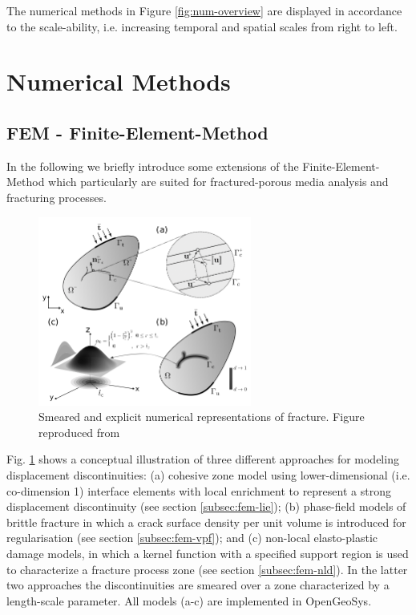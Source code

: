 The numerical methods in Figure \ref{fig:num-overview} are displayed in accordance to the scale-ability, i.e. increasing temporal and spatial scales from right to left.


\section{Numerical Methods}




\subsection*{FEM - Finite-Element-Method}
In the following we briefly introduce some extensions of the Finite-Element-Method which particularly are suited for fractured-porous media analysis and fracturing processes.

\label{subsec:fem-lie}


\label{subsec:fem-vpf}

\label{subsec:fem-nld}
\begin{figure}
\centering
\includegraphics[width=7cm]{figures/Schematic_figure_LIE_PF_NLD}
\caption{Smeared and explicit numerical representations of fracture. Figure reproduced from~\cite{Yoshioka2019}}
\label{fig:ogsfem-overview}
\end{figure}
Fig. \ref{fig:ogsfem-overview} shows a conceptual illustration of three different approaches for modeling displacement discontinuities: (a) cohesive zone model using lower-dimensional (i.e. co-dimension 1) interface elements with local enrichment to represent a strong displacement discontinuity (see section \ref{subsec:fem-lie}); (b) phase-field models of brittle fracture in which a crack surface density per unit volume is introduced for regularisation (see section \ref{subsec:fem-vpf}); and (c) non-local elasto-plastic damage models, in which a kernel function with a specified support region is used to characterize a fracture process zone (see section \ref{subsec:fem-nld}). In the latter two approaches the discontinuities are smeared over a zone characterized by a length-scale parameter. All models (a-c) are implemented in OpenGeoSys.